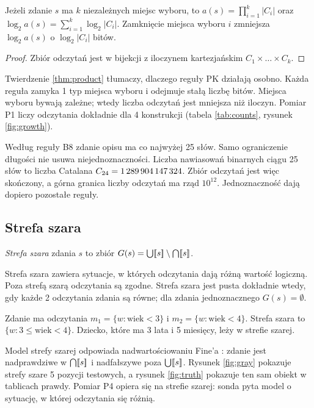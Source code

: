 \begin{theorem}
\label{thm:product}
Jeżeli zdanie $s$ ma $k$ niezależnych miejsc wyboru, to
$a(s)=\prod_{i=1}^{k}|C_i|$ oraz $\log_2 a(s)=\sum_{i=1}^{k}\log_2|C_i|$.
Zamknięcie miejsca wyboru $i$ zmniejsza $\log_2 a(s)$ o $\log_2|C_i|$ bitów.
\end{theorem}

\begin{proof}
Zbiór odczytań jest w bijekcji z iloczynem kartezjańskim $C_1\times\dots\times C_k$.
\end{proof}

Twierdzenie \ref{thm:product} tłumaczy, dlaczego reguły PK działają osobno. Każda reguła
zamyka 1 typ miejsca wyboru i odejmuje stałą liczbę bitów. Miejsca wyboru bywają zależne;
wtedy liczba odczytań jest mniejsza niż iloczyn. Pomiar P1 liczy odczytania dokładnie dla
4 konstrukcji (tabela \ref{tab:counts}, rysunek \ref{fig:growth}).

Według reguły B8 zdanie opisu ma co najwyżej 25 słów. Samo ograniczenie długości nie usuwa
niejednoznaczności. Liczba nawiasowań binarnych ciągu 25 słów to liczba Catalana
$C_{24}=\text{1\,289\,904\,147\,324}$. Zbiór odczytań jest więc skończony, a górna granica liczby odczytań
ma rząd $10^{12}$. Jednoznaczność dają dopiero pozostałe reguły.

\subsection{Strefa szara}

\begin{definition}
\emph{Strefa szara} zdania $s$ to zbiór
$G(s)=\bigcup[\![s]\!]\setminus\bigcap[\![s]\!]$.
\end{definition}

Strefa szara zawiera sytuacje, w których odczytania dają różną wartość logiczną. Poza
strefą szarą odczytania są zgodne. Strefa szara jest pusta dokładnie wtedy, gdy każde
2 odczytania zdania są równe; dla zdania jednoznacznego $G(s)=\emptyset$.

\begin{example}
Zdanie  ma odczytania $m_1=\{w:\text{wiek}<3\}$
i $m_2=\{w:\text{wiek}<4\}$. Strefa szara to $\{w:3\le\text{wiek}<4\}$. Dziecko, które ma
3 lata i 5 miesięcy, leży w strefie szarej.
\end{example}

Model strefy szarej odpowiada nadwartościowaniu Fine'a \cite{fine1975}: zdanie jest
nadprawdziwe w $\bigcap[\![s]\!]$ i nadfałszywe poza $\bigcup[\![s]\!]$. Rysunek
\ref{fig:gray} pokazuje strefy szare 5 pozycji testowych, a rysunek \ref{fig:truth}
pokazuje ten sam obiekt w tablicach prawdy. Pomiar P4 opiera się na strefie szarej: sonda
pyta model o sytuację, w której odczytania się różnią.

